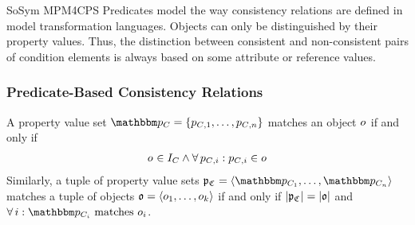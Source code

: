 \begin{copiedFrom}{SoSym MPM4CPS}
Predicates model the way consistency relations are defined in %
model transformation languages. Objects can only be distinguished by their property values. Thus, the distinction between consistent and non-consistent pairs of condition elements is always based on some attribute or reference values.

\subsubsection{Predicate-Based Consistency Relations}
\label{sec:predicatebasedconsistencyrelations}

\begin{definition}
A property value set $\propertyvalueset{p}{\class{C}{}} = \{p_{\class{C}{}, 1}, \dots, p_{\class{C}{}, n}\}$ matches an object $o_{}$ if and only if
\begin{align*}
    \formulaskip &
    \object{o}{} \in I_{\class{C}{}} \wedge \forall p_{\class{C}{}, i} : p_{\class{C}{}, i} \in \object{o}{}
\end{align*}
%
Similarly, a tuple of property value sets $\propertyvaluesettuple{p}{\classtuple{C}{}} = \tupled{\propertyvalueset{p}{\class{C}{1}}, \dots, \propertyvalueset{p}{\class{C}{n}}}$ matches a tuple of objects $\mathfrak{o} = \langle o_{1}, \dots, o_{k} \rangle$ if and only if $|\mathfrak{p}_{\mathfrak{C}_{}}| = |\mathfrak{o}|$ and $\forall i : \propertyvalueset{p}{\class{C}{i}}\ \text{matches}\ \object{o}{i}$.
\end{definition}


\end{copiedFrom}
